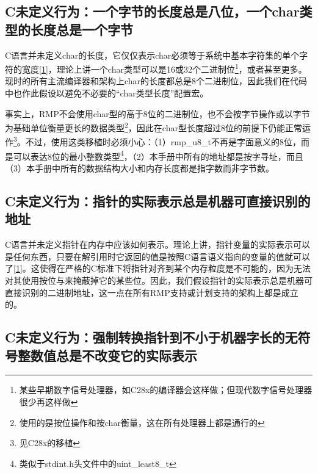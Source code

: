 \subsection{C未定义行为：一个字节的长度总是八位，一个char类型的长度总是一个字节}\label{subsec:c-undefined-behaviour-a-byte-is-always-eight-bits-and-a-char-is-always-one-byte}

C语言并未定义char的长度，它仅仅表示char必须等于系统中基本字符集的单个字符的宽度\hyperref[sec:chapter-bibliography-11]{{[}1{]}}，理论上讲一个char类型可以是16或32个二进制位\footnote{某些早期数字信号处理器，如C28x的编译器会这样做；但现代数字信号处理器很少再这样做}，或者甚至更多。现时的所有主流编译器和架构上char的长度都总是8个二进制位，因此我们在代码中也作此假设以避免不必要的``char类型长度''配置宏。

事实上，RMP不会使用char型的高于8位的二进制位，也不会按字节操作或以字节为基础单位衡量更长的数据类型\footnote{使用的是按位操作和按char衡量，这在所有处理器上都是通行的}，因此在char型长度超过8位的前提下仍能正常运作\footnote{见C28x的移植}。不过，使用这类移植时必须小心：（1）rmp\_u8\_t不再是字面意义的8位，而是可以表达8位的最小整数类型\footnote{类似于stdint.h头文件中的uint\_least8\_t}，（2）本手册中所有的地址都是按字寻址，而且（3）本手册中所有的数据结构大小和内存长度都是指字数而非字节数。

\subsection{C未定义行为：指针的实际表示总是机器可直接识别的地址}\label{subsec:c-undefined-behaviour-a-pointer-actual-representation-is-always-a-machine-recognisable-address}

\protect{}\label{subsec:c-undefined-behaviour-a-pointer-actual-representation-is-always-a-machine-recognisable-address-2}C语言并未定义指针在内存中应该如何表示。理论上讲，指针变量的实际表示可以是任何东西，只要在解引用时它返回的值是按照C语言语义指向的变量的值就可以了\hyperref[sec:chapter-bibliography-11]{{[}1{]}}。这使得在严格的C标准下将指针对齐到某个内存粒度是不可能的，因为无法对其使用按位与来掩蔽掉它的某些位。因此，我们假设指针的实际表示总是机器可直接识别的二进制地址，这一点在所有RMP支持或计划支持的架构上都是成立的。

\subsection{C未定义行为：强制转换指针到不小于机器字长的无符号整数值总是不改变它的实际表示}\label{subsec:c-undefined-behaviour-converting-a-pointer-to-an-unsigned-integer-no-smaller-than-a-machine-word-always-preserves-its-actual-representation}

